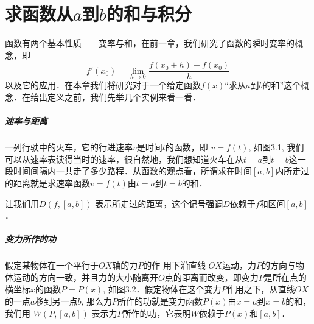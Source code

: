 \chapter{求函数从$a$到$b$的和与积分}
函数有两个基本性质——变率与和，在前一章，我们研究了函数的瞬时变率的概念，即
\[f'(x_0) =\lim_{h\to 0} \frac{f (x_0+h) -f (x_0)}{h}\]
以及它的应用．在本章我们将研究对于一个给定函数$f(x)$“求从$a$到$b$的和”这个概念．在给出定义之前，我们先举几个实例来看一看．

\paragraph{速率与距离} 
一列行驶中的火车，它的行进速率$v$是时间$t$的函数，即
$v=f(t)$, 如图3.1, 我们可以从速率表读得当时的速率，很自然地，我们想知道火车在从$t=a$到$t=b$这一段时间间隔内一共走了多少路程．从函数的观点看，所谓求在时间$[a,b]$内所走过的距离就是求速率函数$v=f(t)$由$t=a$到$t=b$的和．

\begin{figure}[htp]
    \centering
{}
    \caption{}
\end{figure}

让我们用$D(f,[a,b])$
表示所走过的距离，这个记号强调$D$依赖于$f$和区间$[a,b]$．

\paragraph{变力所作的功}

假定某物体在一个平行于$OX$轴的力$P$的作 用下沿直线
$OX$运动，力$P$的方向与物体运动的方向一致，并且力的大小随离开$O$点的距离而改变，即变力$P$是所在点的横坐标$x$的函数$P=P(x)$, 如图3.2．假定物体在这个变力$P$作用之下，从直线$OX$的一点$a$移到另一点$b$, 那么力$P$所作的功就是变力函数$P(x)$由$x=a$到$x=b$的和，我们用
$W (P, [a,b])$
表示力$P$所作的功，它表明$W$依赖于$P(x)$和$[a,b]$．

